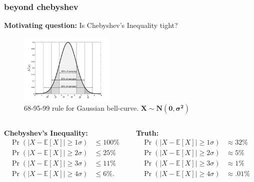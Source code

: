 \documentclass[handout,compress]{beamer}
\newcommand{\E}{\mathbb{E}}
\begin{document}
\begin{frame}
	\frametitle{beyond chebyshev}
	\textbf{Motivating question:} Is Chebyshev's Inequality tight?
	\vspace{-.5em}
		\begin{figure}
			\centering
			\includegraphics[width=0.4\textwidth]{689599rule.png}
			\caption{68-95-99 rule for Gaussian bell-curve. \alert{$\mathbf{X\sim N(0,\sigma^2)}$}}
		\end{figure}
	
		\begin{columns}
			\begin{column}{.5\textwidth}
				\small
				\textbf{Chebyshev's Inequality:}
				\vspace{-.5em}
				\begin{align*}
					\Pr\left(|X - \E[X]| \geq 1\sigma \right) &\leq 100\% \\
					\Pr\left(|X - \E[X]| \geq 2\sigma \right) &\leq 25\% \\
					\Pr\left(|X - \E[X]| \geq 3\sigma \right) &\leq 11\% \\
					\Pr\left(|X - \E[X]| \geq 4\sigma \right) &\leq 6\%.
				\end{align*}
			\end{column}
			\begin{column}{.5\textwidth}
				\small
				\textbf{Truth:}
				\vspace{-.5em}
				\begin{align*}
					\Pr\left(|X - \E[X]| \geq 1\sigma \right) &\approx 32\% \\
					\Pr\left(|X - \E[X]| \geq 2\sigma \right) &\approx 5\% \\
					\Pr\left(|X - \E[X]| \geq 3\sigma \right) &\approx 1\% \\
					\Pr\left(|X - \E[X]| \geq 4\sigma \right) &\approx .01\%
				\end{align*}
			\end{column}
		\end{columns}
\end{frame}
\end{document}
